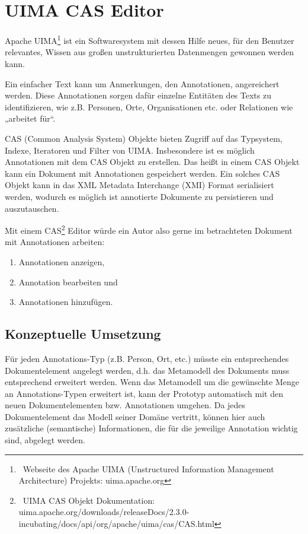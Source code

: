 \section{UIMA CAS Editor}\label{uima-cas-kapitel}
 
Apache UIMA\footnote{~Webseite des Apache UIMA (Unstructured Information Management Architecture) Projekts: uima.apache.org } ist ein Softwaresystem mit dessen Hilfe neues, für den Benutzer relevantes, Wissen aus großen unstrukturierten Datenmengen gewonnen werden kann.

 
Ein einfacher Text kann um Anmerkungen, den Annotationen, angereichert werden. Diese Annotationen sorgen dafür einzelne Entitäten des Texts zu identifizieren, wie z.B. Personen, Orte, Organisationen etc. oder Relationen wie „arbeitet für“.

 
CAS (Common Analysis System) Objekte bieten Zugriff auf das Typsystem, Indexe, Iteratoren und Filter von UIMA. Insbesondere ist es möglich Annotationen mit dem CAS Objekt zu erstellen. Das heißt in einem CAS Objekt kann ein Dokument mit Annotationen gespeichert werden. Ein solches CAS Objekt kann in das XML Metadata Interchange (XMI) Format serialisiert werden, wodurch es möglich ist annotierte Dokumente zu persistieren und auszutauschen.

 
Mit einem CAS\footnote{~UIMA CAS Objekt Dokumentation: uima.apache.org/downloads/releaseDocs/2.3.0-incubating/docs/api/org/apache/uima/cas/CAS.html} Editor würde ein Autor also gerne im betrachteten Dokument mit Annotationen arbeiten:

 
\begin{enumerate}

\item Annotationen anzeigen,
\item Annotation bearbeiten und
\item Annotationen hinzufügen.
\end{enumerate}
 
\subsection{Konzeptuelle Umsetzung}\label{}
 
Für jeden Annotations-Typ (z.B. Person, Ort, etc.) müsste ein entsprechendes Dokumentelement angelegt werden, d.h. das Metamodell des Dokuments muss entsprechend erweitert werden. Wenn das Metamodell um die gewünschte Menge an Annotations-Typen erweitert ist, kann der Prototyp automatisch mit den neuen Dokumentelementen bzw. Annotationen umgehen. Da jedes Dokumentelement das Modell seiner Domäne vertritt, können hier auch zusätzliche (semantische) Informationen, die für die jeweilige Annotation wichtig sind, abgelegt werden.

